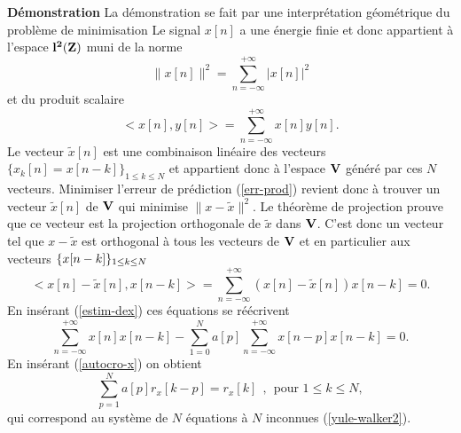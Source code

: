 {\bf D\'emonstration} La d\'emonstration se fait par une
interpr\'etation g\'eom\'etrique du probl\`eme de minimisation
Le signal $x[n]$ a une \'energie finie et donc appartient
\`a l'espace ${\bf l ^ 2 ({\bf{Z}})}$ muni de la
norme
\[
\| x[n] \|^2 = \sum_{n=-\infty}^{+\infty} |x[n]|^2
\]
et du produit scalaire
\[
<x[n],y[n]> = \sum_{n=-\infty}^{+\infty} x[n] y[n] .
\]
Le vecteur $\tilde x[n]$ est une combinaison lin\'eaire des
vecteurs $\{x_k [n] = x[n-k]\}_{1 \leq k \leq N}$
et appartient donc \`a l'espace ${\bf V}$
g\'en\'er\'e par ces $N$ vecteurs.
Minimiser l'erreur de pr\'ediction (\ref{err-prod}) revient
donc \`a trouver un vecteur $\tilde x[n]$ de ${\bf V}$ qui minimise
$\|x - \tilde x \|^2$.
Le th\'eor\`eme de projection prouve que ce vecteur
est la projection orthogonale de $\tilde x$ dans ${\bf V}$.
C'est donc un vecteur tel que $x - \tilde x$ est orthogonal \`a
tous les vecteurs de ${\bf V}$ et en particulier aux vecteurs
$\{ x[n-k] \}_{ 1 \leq k \leq N}$
\[
<x[n] - \tilde x [n] , x[n-k]> =
\sum_{n=-\infty}^{+\infty} (x[n] - \tilde x [n])  x[n-k] =  0 .
\]
En ins\'erant (\ref{estim-dex})
ces \'equations se r\'e\'ecrivent
\begin{equation}
\label{proj-equai}
\sum_{n=-\infty}^{+\infty} x[n] x[n-k] -
\sum_{1=0}^N a[p] \sum_{n=-\infty}^{+\infty} x[n-p] x[n-k] = 0 .
\end{equation}
En ins\'erant (\ref{autocro-x}) on obtient
\[
\sum_{p=1}^N a[p] r_x[k-p] = r_x [k]~~,~~\mbox{pour $1 \leq k \leq N$} ,
\]
qui correspond au syst\`eme de $N$ \'equations
\`a $N$ inconnues (\ref{yule-walker2}).

